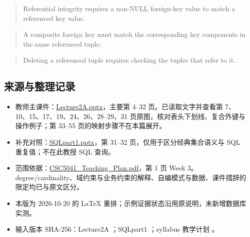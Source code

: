 \begin{quote}
Referential integrity requires a non-NULL foreign-key value to match a referenced key value.
\end{quote}

\begin{quote}
A composite foreign key must match the corresponding key components in the same referenced tuple.
\end{quote}

\begin{quote}
Deleting a referenced tuple requires checking the tuples that refer to it.
\end{quote}

\subsection{来源与整理记录}\label{03_relational_model_and_integrity_zh-ux6765ux6e90ux4e0eux6574ux7406ux8bb0ux5f55}

\begin{itemize}
\tightlist
\item
  教师主课件：\href{../../../slides/Lecture2A.pptx}{Lecture2A.pptx}，主要第 4--32 页。已读取文字并查看第 7、10、15、17、19、24、26、28--29、31 页原图，核对表头下划线、复合外键与操作例子；第 33--55 页的映射步骤不在本篇展开。
\item
  补充对照：\href{../../../slides/SQLpart1.pptx}{SQLpart1.pptx}，第 31--32 页，仅用于区分经典集合语义与 SQL 重复值；不在此教授 SQL 查询。
\item
  范围依据：\href{../../../syllabus/CSC5041_Teaching_Plan.pdf}{CSC5041\_Teaching\_Plan.pdf}，第 1 页 Week 3。degree/cardinality、域约束与业务约束的解释、自编模式与数据、课件措辞的限定均已与原文区分。
\item
  本版为 2026-10-20 的 LaTeX 重排；示例证据状态沿用原说明，未新增数据库实测。
\item
  输入版本 SHA-256：Lecture2A \texttt{}；SQLpart1 \texttt{}；syllabus 教学计划 \texttt{}。
\end{itemize}
